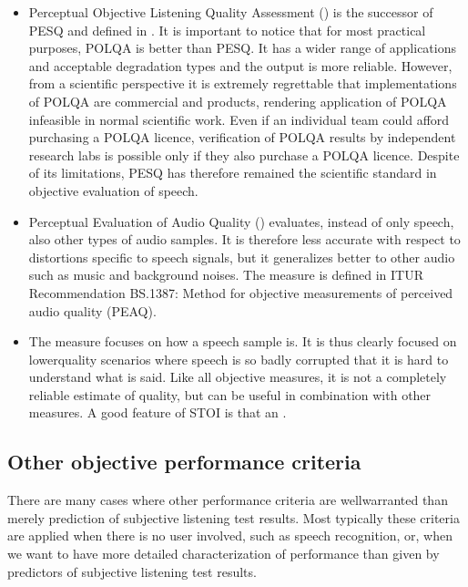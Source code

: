 \documentclass[letterpaper,10pt,english]{jupyterBook}
\begin{document}
\begin{itemize}
\item {} 
\sphinxAtStartPar
Perceptual Objective Listening Quality Assessment
() is the
successor of PESQ and defined in . It is important
to notice that for most practical purposes, POLQA is better than
PESQ. It has a wider range of applications and acceptable
degradation types and the output is more reliable. However, from a
scientific perspective it is extremely regrettable that
implementations of POLQA are commercial and  products,
rendering application of POLQA infeasible in normal scientific work.
Even if an individual team could afford purchasing a POLQA licence,
verification of POLQA results by independent research labs is
possible only if they also purchase a POLQA licence. Despite of its
limitations, PESQ has therefore remained the scientific standard in
objective evaluation of speech.

\item {} 
\sphinxAtStartPar
Perceptual Evaluation of Audio Quality
() evaluates,
instead of only speech, also other types of audio samples. It is
therefore less accurate with respect to distortions specific to
speech signals, but it generalizes better to other audio such as
music and background noises. The measure is defined in
ITU\sphinxhyphen{}R
Recommendation BS.1387: Method for objective measurements of
perceived audio quality (PEAQ).

\item {} 
\sphinxAtStartPar
The  measure
focuses on how  a speech sample is. It is thus clearly
focused on lower\sphinxhyphen{}quality scenarios where speech is so badly
corrupted that it is hard to understand what is said. Like all
objective measures, it is not a completely reliable estimate of
quality, but can be useful in combination with other measures. A
good feature of STOI is that an .

\end{itemize}


\subsection{Other objective performance criteria}
\label{\detokenize{Evaluation/Objective_quality_evaluation:other-objective-performance-criteria}}
\sphinxAtStartPar
There are many cases where other performance criteria are well\sphinxhyphen{}warranted
than merely prediction of subjective listening test results. Most
typically these criteria are applied when there is no user involved,
such as speech recognition, or, when we want to have more detailed
characterization of performance than given by predictors of subjective
listening test results.
\end{document}
